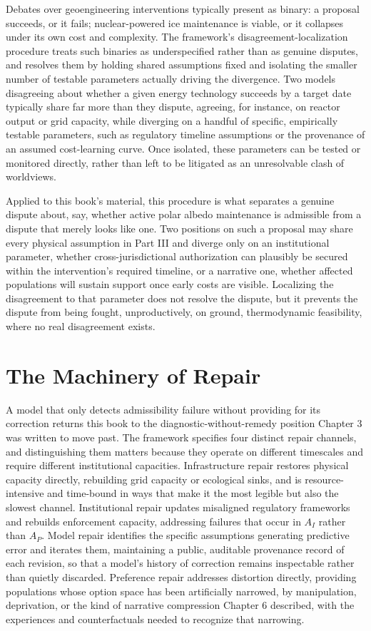 \documentclass[11pt,oneside]{book}
\begin{document}
Debates over geoengineering interventions typically present as binary: a proposal succeeds, or it fails; nuclear-powered ice maintenance is viable, or it collapses under its own cost and complexity. The framework's disagreement-localization procedure treats such binaries as underspecified rather than as genuine disputes, and resolves them by holding shared assumptions fixed and isolating the smaller number of testable parameters actually driving the divergence. Two models disagreeing about whether a given energy technology succeeds by a target date typically share far more than they dispute, agreeing, for instance, on reactor output or grid capacity, while diverging on a handful of specific, empirically testable parameters, such as regulatory timeline assumptions or the provenance of an assumed cost-learning curve. Once isolated, these parameters can be tested or monitored directly, rather than left to be litigated as an unresolvable clash of worldviews.

Applied to this book's material, this procedure is what separates a genuine dispute about, say, whether active polar albedo maintenance is admissible from a dispute that merely looks like one. Two positions on such a proposal may share every physical assumption in Part III and diverge only on an institutional parameter, whether cross-jurisdictional authorization can plausibly be secured within the intervention's required timeline, or a narrative one, whether affected populations will sustain support once early costs are visible. Localizing the disagreement to that parameter does not resolve the dispute, but it prevents the dispute from being fought, unproductively, on ground, thermodynamic feasibility, where no real disagreement exists.

\section*{The Machinery of Repair}

A model that only detects admissibility failure without providing for its correction returns this book to the diagnostic-without-remedy position Chapter 3 was written to move past. The framework specifies four distinct repair channels, and distinguishing them matters because they operate on different timescales and require different institutional capacities. Infrastructure repair restores physical capacity directly, rebuilding grid capacity or ecological sinks, and is resource-intensive and time-bound in ways that make it the most legible but also the slowest channel. Institutional repair updates misaligned regulatory frameworks and rebuilds enforcement capacity, addressing failures that occur in $A_I$ rather than $A_P$. Model repair identifies the specific assumptions generating predictive error and iterates them, maintaining a public, auditable provenance record of each revision, so that a model's history of correction remains inspectable rather than quietly discarded. Preference repair addresses distortion directly, providing populations whose option space has been artificially narrowed, by manipulation, deprivation, or the kind of narrative compression Chapter 6 described, with the experiences and counterfactuals needed to recognize that narrowing.
\end{document}

